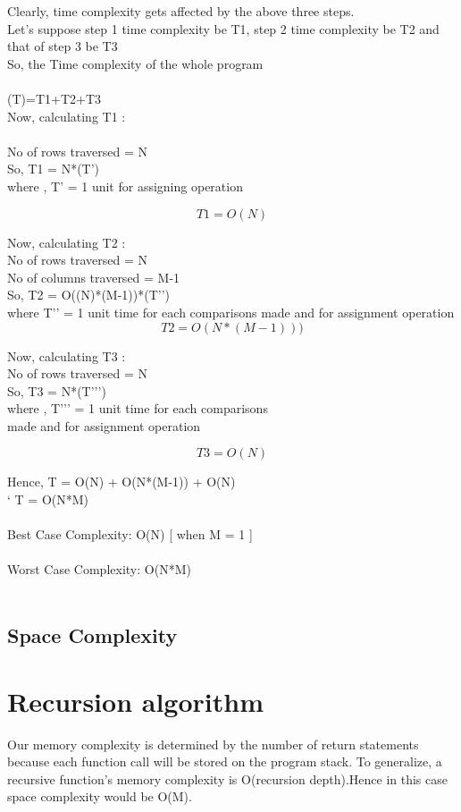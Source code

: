 \documentclass[conference]{IEEEtran}
\begin{document}
Clearly, time complexity gets affected by the above three steps.\\
Let's suppose step 1 time complexity be T1,  step 2 time complexity be T2 and that of step 3 be T3\\
So, the Time complexity of the whole program\\\\ (T)=T1+T2+T3\\

Now, calculating T1 :\\\\

No of rows traversed = N\\
So, T1 = N*(T’)\\
where , T’ = 1 unit for assigning operation

\[T1 = O(N)\]



 Now, calculating T2 :\\
No of rows traversed = N\\
No of columns traversed  = M-1\\
So, T2 = O((N)*(M-1))*(T’’)\\
where T’’ = 1 unit time for each comparisons made and for assignment operation
\[T2 = O(N*(M-1)))\]


Now, calculating T3 :\\
 No of rows traversed = N\\
 So, T3 = N*(T’’’)\\
        where , T’’’ = 1 unit time for each comparisons \\
                         made and for assignment operation
  
 
 \[T3 = O(N)\]

Hence, T = O(N) + O(N*(M-1)) + O(N)\\
`      T	 = O(N*M)\\\\

Best Case Complexity: O(N) [ when M = 1 ]\\\\

Worst Case Complexity: O(N*M)\\\\


\subsection{Space Complexity}
\section*{Recursion algorithm}
Our memory complexity is determined by the number of return statements because each function call will be stored on the program stack. To generalize, a recursive function's memory complexity is O(recursion depth).Hence in this case space complexity would be O(M).\bigskip
\end{document}
